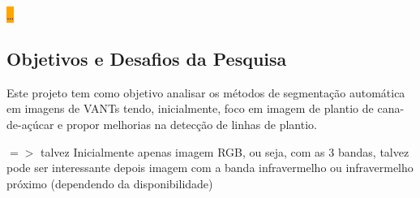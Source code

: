 \documentclass[12pt, a4paper, english, brazil]{article}
\newcommand{\textRed}[1]{{{\color{red} #1}}}
\newcommand{\dotsBlue}{\colorbox{orange}{\textcolor{blue}{\dots}}}
\begin{document}
\dotsBlue

 
\subsection{Objetivos e Desafios da Pesquisa}

Este projeto tem como objetivo analisar os métodos de segmentação automática em imagens de VANTs tendo, inicialmente, foco em imagem de plantio de cana-de-açúcar e propor melhorias na detecção de linhas de plantio. 

$=>$ \textRed{talvez} Inicialmente apenas imagem RGB, ou seja, com as 3 bandas, talvez pode ser interessante depois imagem com a banda infravermelho ou infravermelho próximo (dependendo da disponibilidade)
\end{document}
